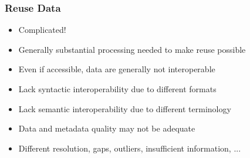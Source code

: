 \documentclass{beamer}
\begin{document}
{
	\begin{frame}[plain]
	\end{frame}
}

\begin{frame}
  \frametitle{Reuse Data}
  
  \begin{itemize}
  \item Complicated!
  \item Generally substantial processing needed to make reuse possible
  \item Even if accessible, data are generally not interoperable
  \item Lack syntactic interoperability due to different formats
  \item Lack semantic interoperability due to different terminology
  \item Data and metadata quality may not be adequate
  \item Different resolution, gaps, outliers, insufficient information, ...
  \end{itemize}
\end{frame}
\end{document}
